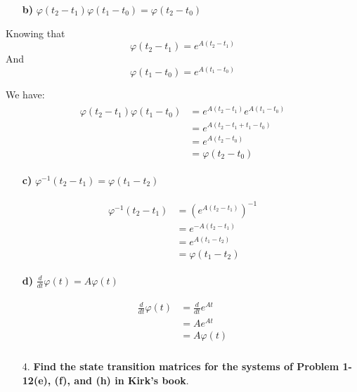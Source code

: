 \documentclass{article}
\begin{document}
\begin{enumerate}[]
\item[\textbf{b)}] $ \varphi(t_2-t_1)\varphi(t_1-t_0) = \varphi(t_2-t_0) $
\end{enumerate}

Knowing that $$ \varphi(t_2-t_1) = e^{A \left( t_2-t_1 \right)} $$
And $$ \varphi(t_1-t_0) = e^{A \left( t_1-t_0\right)} $$

We have: 
\begin{eqnarray*}
\begin{split}
	\varphi(t_2-t_1)\varphi(t_1-t_0) &= e^{A \left( t_2-t_1 \right)}e^{A \left( t_1-t_0 \right)} \\
	&= e^{A \left( t_2-t_1+t_1-t_0 \right)} \\
	&= e^{A \left( t_2-t_0 \right)} \\
	&= \varphi(t_2-t_0)
\end{split}
\end{eqnarray*}

\begin{enumerate}[]
\item[\textbf{c)}] $ \varphi^{-1}(t_2-t_1) = \varphi(t_1-t_2) $
\end{enumerate}
\begin{eqnarray*}
\begin{split}
	\varphi^{-1}(t_2-t_1) &= \left( e^{A \left( t_2-t_1\right)}\right)^{-1} \\	
	&= e^{-A \left( t_2-t_1\right)} \\
	&= e^{A \left( t_1-t_2\right)} \\
	&= \varphi(t_1-t_2)
\end{split}
\end{eqnarray*}

\begin{enumerate}[]
\item[\textbf{d)}] $ \frac{d}{dt}\varphi(t) = A\varphi(t) $
\end{enumerate}
\begin{eqnarray*}
\begin{split}
	\frac{d}{dt}\varphi(t) &= \frac{d}{dt}e^{At}\\
	&= Ae^{At}\\
	&= A\varphi(t)\\
\end{split}
\end{eqnarray*}

\begin{enumerate}[]
\item[4.] \textbf{Find the state transition matrices for the systems of Problem 1-12(e), (f), and (h) in Kirk's book}.
\end{enumerate}
\end{document}
